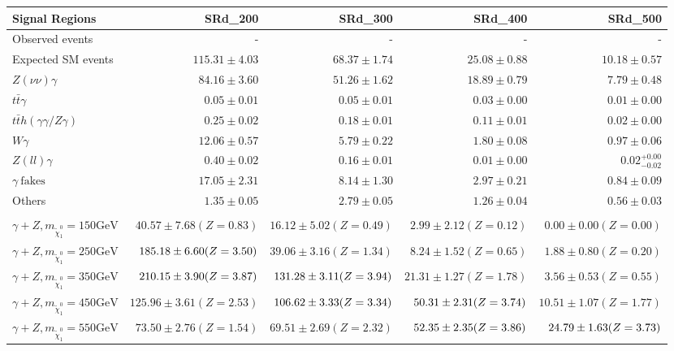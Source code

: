 \begin{tabular}{lrrrr}
\hline
Signal Regions & SRd\_200 & SRd\_300 & SRd\_400 & SRd\_500 \\
\hline
Observed events & - & - & - & - \\
\hline
Expected SM events & $115.31 \pm 4.03$ & $68.37 \pm 1.74$ & $25.08 \pm 0.88$ & $10.18 \pm 0.57$ \\
\hline
$Z(\nu\nu)\gamma$ & $84.16 \pm 3.60$ & $51.26 \pm 1.62$ & $18.89 \pm 0.79$ & $7.79 \pm 0.48$ \\
$t\bar{t}\gamma$ & $0.05 \pm 0.01$ & $0.05 \pm 0.01$ & $0.03 \pm 0.00$ & $0.01 \pm 0.00$ \\
$t\bar{t}h(\gamma\gamma/Z\gamma)$ & $0.25 \pm 0.02$ & $0.18 \pm 0.01$ & $0.11 \pm 0.01$ & $0.02 \pm 0.00$ \\
$W\gamma$ & $12.06 \pm 0.57$ & $5.79 \pm 0.22$ & $1.80 \pm 0.08$ & $0.97 \pm 0.06$ \\
$Z(ll)\gamma$ & $0.40 \pm 0.02$ & $0.16 \pm 0.01$ & $0.01 \pm 0.00$ & $0.02_{-0.02}^{+0.00}$ \\
$\gamma\ \text{fakes}$ & $17.05 \pm 2.31$ & $8.14 \pm 1.30$ & $2.97 \pm 0.21$ & $0.84 \pm 0.09$ \\
Others & $1.35 \pm 0.05$ & $2.79 \pm 0.05$ & $1.26 \pm 0.04$ & $0.56 \pm 0.03$ \\
\hline
 &  &  &  &  \\
\hline
$\gamma+Z, m_{\tilde{\chi}_{1}^{0}} = 150 \text{GeV}$ & $ 40.57 \pm 7.68 (Z=0.83)$ & $ 16.12 \pm 5.02 (Z=0.49)$ & $ 2.99 \pm 2.12 (Z=0.12)$ & $ 0.00 \pm 0.00 (Z=0.00)$ \\
$\gamma+Z, m_{\tilde{\chi}_{1}^{0}} = 250 \text{GeV}$ & $\cellcolor{lightgreen} 185.18 \pm 6.60 (Z=3.50)$ & $ 39.06 \pm 3.16 (Z=1.34)$ & $ 8.24 \pm 1.52 (Z=0.65)$ & $ 1.88 \pm 0.80 (Z=0.20)$ \\
$\gamma+Z, m_{\tilde{\chi}_{1}^{0}} = 350 \text{GeV}$ & $\cellcolor{lightgreen} 210.15 \pm 3.90 (Z=3.87)$ & $\cellcolor{lightgreen} 131.28 \pm 3.11 (Z=3.94)$ & $ 21.31 \pm 1.27 (Z=1.78)$ & $ 3.56 \pm 0.53 (Z=0.55)$ \\
$\gamma+Z, m_{\tilde{\chi}_{1}^{0}} = 450 \text{GeV}$ & $ 125.96 \pm 3.61 (Z=2.53)$ & $\cellcolor{lightgreen} 106.62 \pm 3.33 (Z=3.34)$ & $\cellcolor{lightgreen} 50.31 \pm 2.31 (Z=3.74)$ & $ 10.51 \pm 1.07 (Z=1.77)$ \\
$\gamma+Z, m_{\tilde{\chi}_{1}^{0}} = 550 \text{GeV}$ & $ 73.50 \pm 2.76 (Z=1.54)$ & $ 69.51 \pm 2.69 (Z=2.32)$ & $\cellcolor{lightgreen} 52.35 \pm 2.35 (Z=3.86)$ & $\cellcolor{lightgreen} 24.79 \pm 1.63 (Z=3.73)$ \\

\end{tabular}

